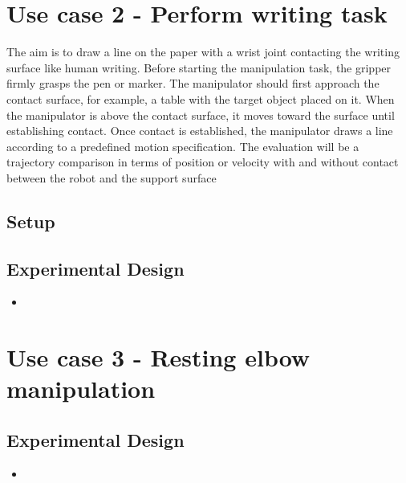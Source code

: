 \documentclass[report.tex]{subfiles}
\begin{document}
    \section{Use case 2 - Perform writing task} 
    The aim is to draw a line on the paper with a wrist joint contacting the writing
    surface like human writing. Before starting the manipulation task, the gripper
    firmly grasps the pen or marker. The manipulator should first approach the
    contact surface, for example, a table with the target object placed on it. When
    the manipulator is above the contact surface, it moves toward the surface until
    establishing contact. Once contact is established, the manipulator draws a line
    according to a predefined motion specification. The evaluation will be a trajectory
    comparison in terms of position or velocity with and without contact between the
    robot and the support surface
        \subsection{Setup}
        \subsection{Experimental Design}
        \begin{itemize}
            \item 
        \end{itemize}
    \section{Use case 3 - Resting elbow manipulation}
        \subsection{Experimental Design}
        \begin{itemize}
            \item 
        \end{itemize} 








\end{document}
